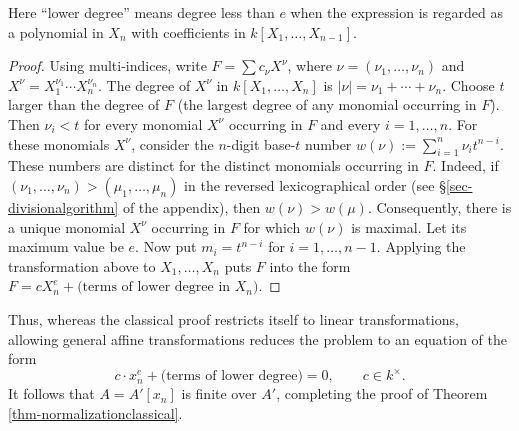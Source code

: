 \documentclass[a4paper,12pt, dvipdfmx]{jsbook}
\newcommand{\abs}[1]{\lvert#1\rvert}
\theoremstyle{plain}
\theoremstyle{definition}
\begin{document}
Here ``lower degree'' means degree less than $e$ when the expression is regarded as a polynomial in $X_n$ with coefficients in $k[X_1,\ldots,X_{n-1}]$.
\begin{proof}[Proof]
Using multi-indices, write $F=\sum c_{\nu}X^{\nu}$, where $\nu=(\nu_1,\ldots,\nu_n)$ and $X^{\nu}=X^{\nu_1}_1\cdots X^{\nu_n}_n$. The degree of $X^{\nu}$ in $k[X_1,\ldots,X_n]$ is $\abs{\nu}=\nu_1+\cdots+\nu_n$.
Choose $t$ larger than the degree of $F$ (the largest degree of any monomial occurring in $F$). Then $\nu_i<t$ for every monomial $X^{\nu}$ occurring in $F$ and every $i=1,\ldots,n$.
For these monomials $X^{\nu}$, consider the $n$-digit base-$t$ number $w(\nu):=\sum^n_{i=1}\nu_it^{n-i}$. These numbers are distinct for the distinct monomials occurring in $F$.
Indeed, if $(\nu_1,\ldots,\nu_n)>(\mu_1,\ldots,\mu_n)$ in the reversed lexicographical order (see \S\ref{sec-divisionalgorithm} of the appendix), then $w(\nu)>w(\mu)$.
Consequently, there is a unique monomial $X^{\nu}$ occurring in $F$ for which $w(\nu)$ is maximal.
Let its maximum value be $e$.
Now put $m_i=t^{n-i}$ for $i=1,\ldots,n-1$. Applying the transformation above to $X_1,\ldots,X_n$ puts $F$ into the form $F=cX^e_n+\textrm{(terms of lower degree in $X_n$)}$.
\end{proof}

Thus, whereas the classical proof restricts itself to linear transformations, allowing general affine transformations reduces the problem to an equation of the form
$$
c\cdot x^e_n+\textrm{(terms of lower degree)}=0,\qquad c\in k^{\times}.
$$
It follows that $A=A'[x_n]$ is finite over $A'$, completing the proof of Theorem \ref{thm-normalizationclassical}.
\end{document}
